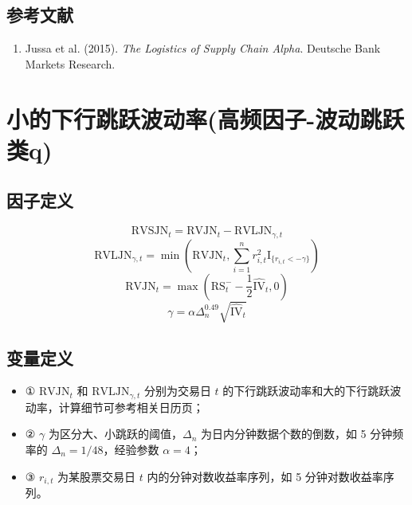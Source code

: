\documentclass{article}
\begin{document}
\subsection{参考文献}
\begin{enumerate}
    \item Jussa et al. (2015). \textit{The Logistics of Supply Chain Alpha}. Deutsche Bank Markets Research.
\end{enumerate}

\section{小的下行跳跃波动率(高频因子-波动跳跃类q)}

\subsection{因子定义}
\begin{equation}
    \mathrm{RVSJN}_t = \mathrm{RVJN}_t - \mathrm{RVLJN}_{\gamma,t}
\end{equation}
\begin{equation}
    \mathrm{RVLJN}_{\gamma,t} = \min\left(\mathrm{RVJN}_t, \sum_{i=1}^n r_{i,t}^2 \mathrm{I}_{\{r_{i,t} < -\gamma\}}\right)
\end{equation}
\begin{equation}
    \mathrm{RVJN}_t = \max\left(\mathrm{RS}_t^- - \frac{1}{2}\hat{\mathrm{IV}}_t, 0\right)
\end{equation}
\begin{equation}
    \gamma = \alpha \Delta_n^{0.49} \sqrt{\hat{\mathrm{IV}}_t}
\end{equation}

\subsection{变量定义}
\begin{itemize}
    \item ① \( \mathrm{RVJN}_t \) 和 \( \mathrm{RVLJN}_{\gamma,t} \) 分别为交易日 \( t \) 的下行跳跃波动率和大的下行跳跃波动率，计算细节可参考相关日历页；
    \item ② \( \gamma \) 为区分大、小跳跃的阈值，\( \Delta_n \) 为日内分钟数据个数的倒数，如 5 分钟频率的 \( \Delta_n = 1/48 \)，经验参数 \( \alpha = 4 \)；
    \item ③ \( r_{i,t} \) 为某股票交易日 \( t \) 内的分钟对数收益率序列，如 5 分钟对数收益率序列。
\end{itemize}
\end{document}
